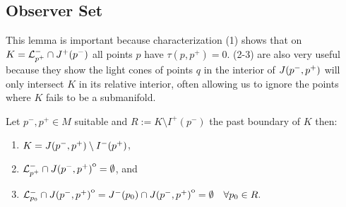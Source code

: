 \subsection{Observer Set}
This lemma is important because characterization (1) shows that on $K={\mathcal{L}}^-_{p^+}\cap J^+(p^-)$ all points $p$ have $\tau(p,p^+)=0$. (2-3) are also very useful because they show the light cones of points $q$ in the interior of $J(p^-,p^+)$ will only intersect $K$ in its relative interior, often allowing us to ignore the points where $K$ fails to be a submanifold. 
\begin{lemma}\label{lem:Kcharact}
    Let $p^-,p^+\in M$ suitable and $R:= K \setminus I^+(p^-)$ the past boundary of $K$ then:
    \begin{enumerate}[label={\textnormal{(\arabic*)}}]
        \item $K=J(p^-,p^+)\setminus I^-(p^+)$,
        \item ${\mathcal{L}}^-_{p^+}\cap {\kern0ptJ(p^-,p^+)}^{\mathrm{o}} = \emptyset$, and 
        \item ${\mathcal{L}}^-_{p_0} \cap {\kern0ptJ(p^-,p^+)}^{\mathrm{o}} = J^-(p_0) \cap {\kern0ptJ(p^-,p^+)}^{\mathrm{o}} = \emptyset \quad \forall p_0\in R.$
    \end{enumerate}
\end{lemma}
